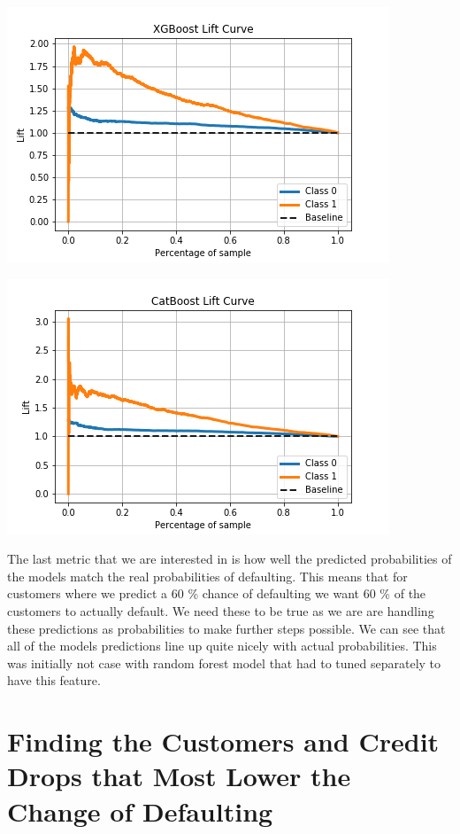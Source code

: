 \documentclass[12pt,a4paper,leqno]{report}
\theoremstyle{plain}
\theoremstyle{definition}
\theoremstyle{remark}
\begin{document}
\bigskip
{
    \centering
    \includegraphics[scale=0.9]{xgboost_lift_curve.png}
    \par
}
\bigskip

\bigskip
{
    \centering
    \includegraphics[scale=0.9]{catboost_lift_curve.png}
    \par
}
\bigskip

The last metric that we are interested in is how well the predicted probabilities
of the models match the real probabilities of defaulting. This means that for customers
where we predict a 60 \% chance of defaulting we want 60 \% of the customers to actually
default. We need these to be true as we are are handling these predictions as probabilities
to make further steps possible. We can see that all of the models predictions
line up quite nicely with actual probabilities. This was initially not case with
random forest model that had to tuned separately to have this feature.

\section{Finding the Customers and Credit Drops that Most Lower the Change of Defaulting}
\end{document}
